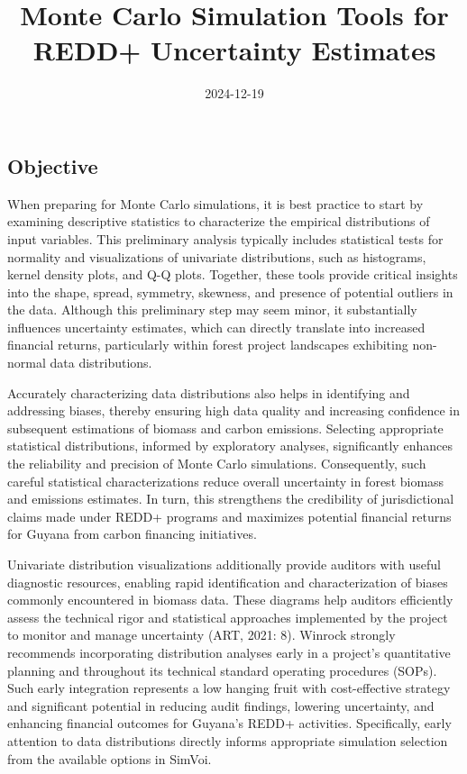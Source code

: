 \documentclass[
]{article}
\title{Monte Carlo Simulation Tools for REDD+ Uncertainty Estimates}
\author{}
\date{\vspace{-2.5em}2024-12-19}
\begin{document}
\maketitle

{
\setcounter{tocdepth}{3}
\tableofcontents
}
\subsection{Objective}\label{objective}

When preparing for Monte Carlo simulations, it is best practice to start
by examining descriptive statistics to characterize the empirical
distributions of input variables. This preliminary analysis typically
includes statistical tests for normality and visualizations of
univariate distributions, such as histograms, kernel density plots, and
Q-Q plots. Together, these tools provide critical insights into the
shape, spread, symmetry, skewness, and presence of potential outliers in
the data. Although this preliminary step may seem minor, it
substantially influences uncertainty estimates, which can directly
translate into increased financial returns, particularly within forest
project landscapes exhibiting non-normal data distributions.

Accurately characterizing data distributions also helps in identifying
and addressing biases, thereby ensuring high data quality and increasing
confidence in subsequent estimations of biomass and carbon emissions.
Selecting appropriate statistical distributions, informed by exploratory
analyses, significantly enhances the reliability and precision of Monte
Carlo simulations. Consequently, such careful statistical
characterizations reduce overall uncertainty in forest biomass and
emissions estimates. In turn, this strengthens the credibility of
jurisdictional claims made under REDD+ programs and maximizes potential
financial returns for Guyana from carbon financing initiatives.

Univariate distribution visualizations additionally provide auditors
with useful diagnostic resources, enabling rapid identification and
characterization of biases commonly encountered in biomass data. These
diagrams help auditors efficiently assess the technical rigor and
statistical approaches implemented by the project to monitor and manage
uncertainty (ART, 2021: 8). Winrock strongly recommends incorporating
distribution analyses early in a project's quantitative planning and
throughout its technical standard operating procedures (SOPs). Such
early integration represents a low hanging fruit with cost-effective
strategy and significant potential in reducing audit findings, lowering
uncertainty, and enhancing financial outcomes for Guyana's REDD+
activities. Specifically, early attention to data distributions directly
informs appropriate simulation selection from the available options in
SimVoi.
\end{document}
